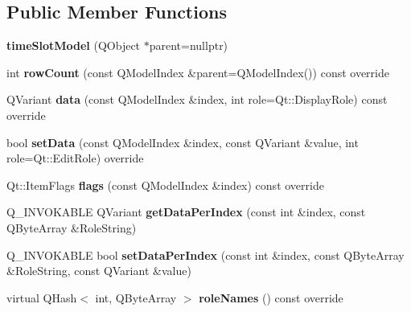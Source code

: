 \subsection*{Public Member Functions}
\begin{DoxyCompactItemize}
\item 
\mbox{\label{classtime_slot_model_a24787c0ad1a00e00d11542c019802576}} 
{\bfseries time\+Slot\+Model} (Q\+Object $\ast$parent=nullptr)
\item 
\mbox{\label{classtime_slot_model_adbccd19c8555413b2c45005d4ab4eac5}} 
int {\bfseries row\+Count} (const Q\+Model\+Index \&parent=Q\+Model\+Index()) const override
\item 
\mbox{\label{classtime_slot_model_ab3f9a4d41419bc39d0d516332a45c001}} 
Q\+Variant {\bfseries data} (const Q\+Model\+Index \&index, int role=Qt\+::\+Display\+Role) const override
\item 
\mbox{\label{classtime_slot_model_a9b4e404c24a5580a317661a3f0b9b62e}} 
bool {\bfseries set\+Data} (const Q\+Model\+Index \&index, const Q\+Variant \&value, int role=Qt\+::\+Edit\+Role) override
\item 
\mbox{\label{classtime_slot_model_a116236ac7f08d69a7f5f841b959dca6a}} 
Qt\+::\+Item\+Flags {\bfseries flags} (const Q\+Model\+Index \&index) const override
\item 
\mbox{\label{classtime_slot_model_ab37cf6b39ebb3e3fc77e96c0371f26ea}} 
Q\+\_\+\+I\+N\+V\+O\+K\+A\+B\+LE Q\+Variant {\bfseries get\+Data\+Per\+Index} (const int \&index, const Q\+Byte\+Array \&Role\+String)
\item 
\mbox{\label{classtime_slot_model_ad5685549c714bca4da318d4dc12f1ca2}} 
Q\+\_\+\+I\+N\+V\+O\+K\+A\+B\+LE bool {\bfseries set\+Data\+Per\+Index} (const int \&index, const Q\+Byte\+Array \&Role\+String, const Q\+Variant \&value)
\item 
\mbox{\label{classtime_slot_model_aec577d91ac6373d6f5b52f82a3fce0bb}} 
virtual Q\+Hash$<$ int, Q\+Byte\+Array $>$ {\bfseries role\+Names} () const override
\item 

\end{DoxyCompactItemize}
